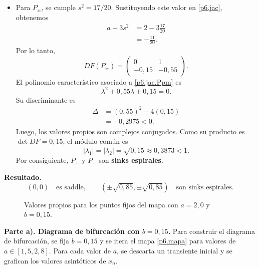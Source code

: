 \documentclass[12pt]{article}
\newcommand{\resultado}{\textbf{Resultado.}\enspace}
\begin{document}
\begin{itemize}
    \item Para $P_\pm$, se cumple $s^2=17/20$. Sustituyendo este valor en \eqref{p6.jac}, obtenemos
    \begin{align*}
        a-3s^2
        &=2-3\frac{17}{20}\\
        &=-\frac{11}{20}.
    \end{align*}
    Por lo tanto,
    \begin{equation}\label{p6.jac.Ppm}
        DF(P_\pm)=
        \begin{pmatrix}
            0 & 1\\
            -0{,}15 & -0{,}55
        \end{pmatrix}.
    \end{equation}
    El polinomio característico asociado a \eqref{p6.jac.Ppm} es
    \begin{equation*}
        \lambda^2+0{,}55\lambda+0{,}15=0.
    \end{equation*}
    Su discriminante es
    \begin{align*}
        \Delta
        &=(0{,}55)^2-4(0{,}15)\\
        &=-0{,}2975<0.
    \end{align*}
    Luego, los valores propios son complejos conjugados. Como su producto es $\det DF=0{,}15$, el módulo común es
    \begin{equation*}
        |\lambda_1|=|\lambda_2|=\sqrt{0{,}15}\approx 0{,}3873<1.
    \end{equation*}
    Por consiguiente, $P_+$ y $P_-$ son \textbf{sinks espirales}.
\end{itemize}

\resultado
\begin{equation*}
    (0,0)\quad \text{es saddle},
    \qquad
    \left(\pm\sqrt{0{,}85},\pm\sqrt{0{,}85}\right)
    \quad \text{son sinks espirales}.
\end{equation*}

\begin{figure}[htbp]
    \centering
    
    \caption{Valores propios para los puntos fijos del mapa con $a=2{,}0$ y $b=0{,}15$.}
\end{figure}

\textbf{Parte a). Diagrama de bifurcación con $b=0{,}15$.}
Para construir el diagrama de bifurcación, se fija $b=0{,}15$ y se itera el mapa \eqref{p6.mapa} para valores de $a\in[1{,}5,2{,}8]$. Para cada valor de $a$, se descarta un transiente inicial y se grafican los valores asintóticos de $x_n$.
\end{document}
